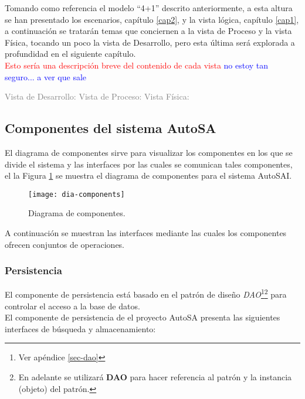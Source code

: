 Tomando como referencia el modelo ``4+1'' descrito anteriormente, a esta altura se han presentado los escenarios, capítulo \ref{cap2}, y la vista lógica, capítulo \ref{cap1}, a continuación se tratarán temas que conciernen a la vista de Proceso y la vista Física, tocando un poco la vista de Desarrollo, pero esta última será explorada a profundidad en el siguiente capítulo.\\

\textcolor{red}{Esto sería una descripción breve del contenido de cada vista}
\textcolor{blue}{no estoy tan seguro... a ver que sale}

\textcolor{gray}{
Vista de Desarrollo:
Vista de Proceso:
Vista Física:
}


\subsection{Componentes del sistema AutoSA}
El diagrama de componentes sirve para visualizar los componentes en los que se divide el sistema y las interfaces por las cuales se comunican tales componentes, el la Figura \ref{fig:dia-components} se muestra el diagrama de componentes para el sistema AutoSAI.
\begin{figure}[h]
\centering
\texttt{[image: dia-components]}
\caption{Diagrama de componentes.}
\label{fig:dia-components}
\end{figure}

A continuación se muestran las interfaces mediante las cuales los componentes ofrecen conjuntos de operaciones.

\subsubsection{Persistencia}
El componente de persistencia está basado en el patrón de diseño \textit{DAO}\footnote{Ver apéndice \ref{sec-dao}}\footnote{En adelante se utilizará \textbf{DAO} para hacer referencia al patrón y la instancia (objeto) del patrón.} para controlar el acceso a la base de datos.\\
El componente de persistencia de el proyecto AutoSA presenta las siguientes interfaces de búsqueda y almacenamiento:

